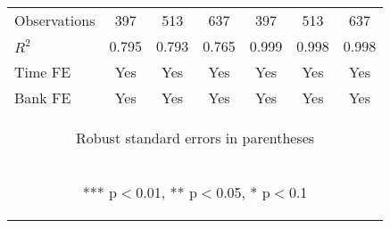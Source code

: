 \documentclass[]{article}
\begin{document}
\begin{center}
\begin{tabular}{lcccccc}
Observations & 397 & 513 & 637 & 397 & 513 & 637 \\
$R^2$ & 0.795 & 0.793 & 0.765 & 0.999 & 0.998 & 0.998 \\
Time FE & Yes & Yes & Yes & Yes & Yes & Yes \\
 Bank FE & Yes & Yes & Yes & Yes & Yes & Yes \\ \hline
\multicolumn{7}{c}{\begin{footnotesize} Robust standard errors in parentheses\end{footnotesize}} \\
\multicolumn{7}{c}{\begin{footnotesize} *** p$<$0.01, ** p$<$0.05, * p$<$0.1\end{footnotesize}} \\
\end{tabular}
\end{center}
\end{document}

